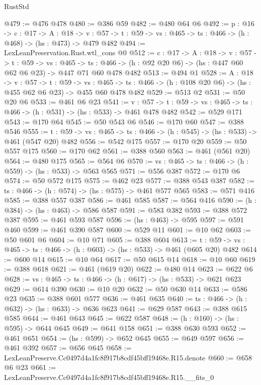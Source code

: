 \begin{lexlean}{RustStd}
\begin{coremodule}
@479 := @476 @478
@480 := @386 @59
@482 := @480 @64 @6
@492 := {p : @16} ->
  {c : @17} ->
  {A : @18} ->
  {v : @57} -> {t : @59} -> {vs : @465} -> {ts : @466} -> (h : @468) -> (hs : @473) -> @479 @482
@494 := LexLeanPreservation.Rust.wtl_cons @0
@512 := {c : @17} ->
  {A : @18} ->
  {v : @57} ->
  {t : @59} ->
  {vs : @465} ->
  {ts : @466} -> (h : @92 @20 @6) -> (hs : @447 @60 @62 @6 @23) -> @447 @71 @60 @478 @482
@513 := @494 @1
@528 := {A : @18} ->
  {v : @57} ->
  {t : @59} ->
  {vs : @465} -> {ts : @466} -> (h : @108 @20 @6) -> (hs : @455 @62 @6 @23) -> @455 @60 @478 @482
@529 := @513 @2
@531 := @50 @20 @6
@533 := @461 @6 @23
@541 := {v : @57} ->
  {t : @59} -> {vs : @465} -> {ts : @466} -> (h : @531) -> (hs : @533) -> @461 @478 @482
@542 := @529 @171
@543 := @170 @64
@545 := @50 @543 @6
@546 := @170 @60
@547 := @388 @546
@555 := {t : @59} -> {vs : @465} -> {ts : @466} -> (h : @545) -> (hs : @533) -> @461 (@547 @20) @482
@556 := @542 @175
@557 := @170 @20
@559 := @50 @557 @175
@560 := @170 @62
@561 := @388 @560
@563 := @461 (@561 @20)
@564 := @480 @175
@565 := @564 @6
@570 := {vs : @465} -> {ts : @466} -> (h : @559) -> (hs : @533) -> @563 @565
@571 := @556 @387
@572 := @170 @6
@574 := @50 @572 @175
@575 := @462 @23
@577 := @388 @543 @387
@582 := {ts : @466} -> (h : @574) -> (hs : @575) -> @461 @577 @565
@583 := @571 @416
@585 := @388 @557 @387
@586 := @461 @585
@587 := @564 @416
@590 := (h : @384) -> (hs : @463) -> @586 @587
@591 := @583 @382
@593 := @388 @572 @387
@595 := @461 @593 @587
@596 := (hs : @463) -> @595
@597 := @591 @460
@599 := @461 @390 @587
@600 := @529 @11
@601 := @10 @62
@603 := @50 @601 @6
@604 := @10 @71
@605 := @388 @604
@613 := {t : @59} -> {vs : @465} -> {ts : @466} -> (h : @603) -> (hs : @533) -> @461 (@605 @20) @482
@614 := @600 @14
@615 := @10 @64
@617 := @50 @615 @14
@618 := @10 @60
@619 := @388 @618
@621 := @461 (@619 @20)
@622 := @480 @14
@623 := @622 @6
@628 := {vs : @465} -> {ts : @466} -> (h : @617) -> (hs : @533) -> @621 @623
@629 := @614 @390
@630 := @10 @20
@632 := @50 @630 @14
@633 := @586 @23
@635 := @388 @601 @577
@636 := @461 @635
@640 := {ts : @466} -> (h : @632) -> (hs : @633) -> @636 @623
@641 := @629 @587
@643 := @388 @615 @585
@644 := @461 @643
@645 := @622 @587
@648 := (h : @160) -> (hs : @595) -> @644 @645
@649 := @641 @158
@651 := @388 @630 @593
@652 := @461 @651
@654 := (hs : @599) -> @652 @645
@655 := @649 @597
@656 := @461 @392
@657 := @656 @645
@658 := LexLeanPreserve.Cc0497d4a1fc8f917b8cdf45bff19468e.R15.denote
@660 := @658 @6 @23
@661 := LexLeanPreserve.Cc0497d4a1fc8f917b8cdf45bff19468e.R15.__fits_0

\end{coremodule}
\end{lexlean}
